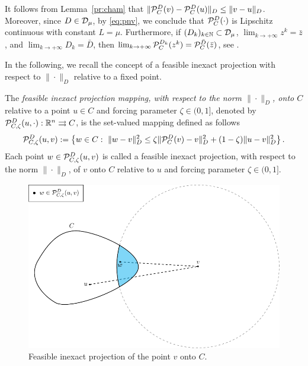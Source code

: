 \begin{remark} \label{re:cproj}
	It follows from Lemma~\ref{pr:cham}  that $\|{\cal P}_{C}^{D}(v)-{\cal P}_{C}^{D}(u)\|_{D}\leq \|v-u\|_{D}$.  Moreover, since   $D\in {\cal D}_{\mu}$, by \eqref{eq:pnv}, we conclude that   ${\cal P}_{C}^{D}(\cdot)$ is Lipschitz continuous with constant $L=\mu$.   Furthermore,  if  $(D_k)_{k\in\mathbb{N}}\subset {\cal D}_{\mu}$,    $\lim_{k\to +\infty} z^{k} = \bar{z}$, and   $\lim_{k \to +\infty} D_{k} = \bar{D}$, then $\lim_{k \to +\infty}{\cal P}_{C}^{D_k}(z^{k})= {\cal P}_{C}^{\bar D}(\bar{z})$, see   \cite[Proposition~4.2]{CombettesVu2013}.
\end{remark}

In the following, we recall  the  concept of a  feasible inexact projection with respect to $\| \cdot \| _{D}$ relative to a fixed point.

\begin{definition} \label{def:InexactM}
	The {\it feasible inexact projection mapping, with respect to the norm $\| \cdot \|_{D}$,   onto $C$}  relative to a point  $u \in C$ and forcing parameter $\zeta\in (0, 1]$, denoted by ${\cal P}_{C,\zeta}^{D}(u,  \cdot): {\mathbb R}^n \rightrightarrows C$,  is the set-valued mapping defined as follows
	\begin{equation} \label{eq:Projwm}
		{\cal P}_{C,\zeta}^{D}(u, v) := \left\{w\in C:~ \|w-v\|_{D}^2\leq \zeta \| {\cal P}_{C}^{D}(v)-v\|_{D}^2+(1-\zeta)\|u-v\|_{D}^2 \right\}.
	\end{equation}
	Each point $w\in {\cal P}_{C,\zeta}^{D}(u, v) $ is called a  feasible inexact projection,  with respect to the norm $\| \cdot \|_{D}$,  of $v$ onto $C$ relative to $u$ and forcing parameter $\zeta\in (0, 1]$.
\end{definition}

\begin{figure}[H]
	\centering
	\includegraphics{figures/martinezProj.pdf}
	\caption{Feasible inexact projection of the point $v$ onto $C$.}
\end{figure}

